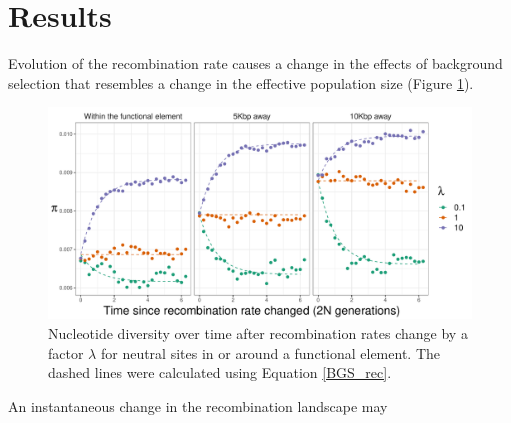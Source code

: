 \documentclass[11pt,twoside,lineno]{GSA_format}
\begin{document}
\section{Results}

Evolution of the recombination rate causes a change in the effects of background selection that resembles a change in the effective population size (Figure \ref{fig:BGS_over_time_fixed_s}). 



\begin{figure}[H]
\includegraphics[width=\textwidth]{../TheoreticalExpectation/B_over_time_fixed_s_plot}
\caption{Nucleotide diversity over time after recombination rates change by a factor $\lambda$ for neutral sites in or around a functional element. The dashed lines were calculated using Equation \ref{BGS_rec}.}
\label{fig:BGS_over_time_fixed_s}
\end{figure}

An instantaneous change in the recombination landscape may 
\end{document}
